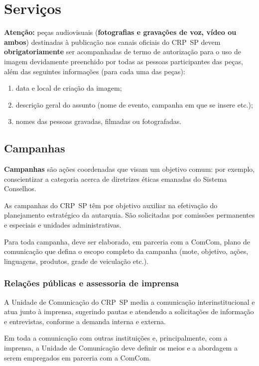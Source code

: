 \section{Serviços}

\textbf{Atenção:} peças audiovisuais (\textbf{fotografias e gravações de
  voz, vídeo ou ambos}) destinadas à publicação nos canais oficiais do
CRP~SP devem \textbf{obrigatoriamente} ser acompanhadas de termo de
autorização para o uso de imagem devidamente preenchido por todas as
pessoas participantes das peças, além das seguintes informações (para
cada uma das peças):

\begin{enumerate}

  \item
        data e local de criação da imagem;
  \item
        descrição geral do assunto (nome de evento, campanha em que se insere
        etc.);
  \item
        nomes das pessoas gravadas, filmadas ou fotografadas.
\end{enumerate}

\subsection{Campanhas}

\textbf{Campanhas} são ações coordenadas que visam um objetivo comum:
por exemplo, conscientizar a categoria acerca de diretrizes éticas
emanadas do Sistema Conselhos.

As campanhas do CRP~SP têm por objetivo auxiliar na efetivação do
planejamento estratégico da autarquia. São solicitadas por comissões
permanentes e especiais e unidades administrativas.

Para toda campanha, deve ser elaborado, em parceria com a ComCom, plano
de comunicação que defina o escopo completo da campanha (mote, objetivo,
ações, linguagens, produtos, grade de veiculação etc.).

\subsubsection{Relações públicas e assessoria de
  imprensa}

A Unidade de Comunicação do CRP~SP media a comunicação
interinstitucional e atua junto à imprensa, sugerindo pautas e atendendo
a solicitações de informação e entrevistas, conforme a demanda interna e
externa.

Em toda a comunicação com outras instituições e, principalmente, com a
imprensa, a Unidade de Comunicação deve definir os meios e a abordagem a
serem empregados em parceria com a ComCom.

